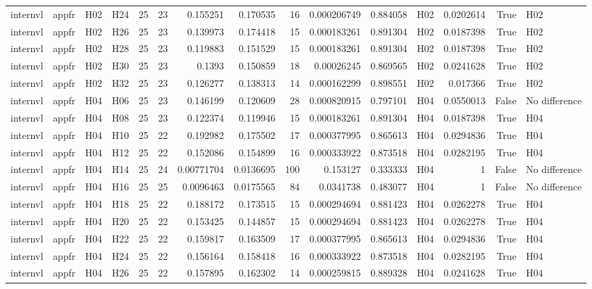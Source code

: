 \begin{longtable}{llllrrrrrrrlrrl}
internvl & appfr & H02 & H24 & 25 & 23 & 0.155251 & 0.170535 & 16 & 0.000206749 & 0.884058 & H02 & 0.0202614 & True & H02 \\
internvl & appfr & H02 & H26 & 25 & 23 & 0.139973 & 0.174418 & 15 & 0.000183261 & 0.891304 & H02 & 0.0187398 & True & H02 \\
internvl & appfr & H02 & H28 & 25 & 23 & 0.119883 & 0.151529 & 15 & 0.000183261 & 0.891304 & H02 & 0.0187398 & True & H02 \\
internvl & appfr & H02 & H30 & 25 & 23 & 0.1393 & 0.150859 & 18 & 0.00026245 & 0.869565 & H02 & 0.0241628 & True & H02 \\
internvl & appfr & H02 & H32 & 25 & 23 & 0.126277 & 0.138313 & 14 & 0.000162299 & 0.898551 & H02 & 0.017366 & True & H02 \\
internvl & appfr & H04 & H06 & 25 & 23 & 0.146199 & 0.120609 & 28 & 0.000820915 & 0.797101 & H04 & 0.0550013 & False & No difference \\
internvl & appfr & H04 & H08 & 25 & 23 & 0.122374 & 0.119946 & 15 & 0.000183261 & 0.891304 & H04 & 0.0187398 & True & H04 \\
internvl & appfr & H04 & H10 & 25 & 22 & 0.192982 & 0.175502 & 17 & 0.000377995 & 0.865613 & H04 & 0.0294836 & True & H04 \\
internvl & appfr & H04 & H12 & 25 & 22 & 0.152086 & 0.154899 & 16 & 0.000333922 & 0.873518 & H04 & 0.0282195 & True & H04 \\
internvl & appfr & H04 & H14 & 25 & 24 & 0.00771704 & 0.0136695 & 100 & 0.153127 & 0.333333 & H04 & 1 & False & No difference \\
internvl & appfr & H04 & H16 & 25 & 25 & 0.0096463 & 0.0175565 & 84 & 0.0341738 & 0.483077 & H04 & 1 & False & No difference \\
internvl & appfr & H04 & H18 & 25 & 22 & 0.188172 & 0.173515 & 15 & 0.000294694 & 0.881423 & H04 & 0.0262278 & True & H04 \\
internvl & appfr & H04 & H20 & 25 & 22 & 0.153425 & 0.144857 & 15 & 0.000294694 & 0.881423 & H04 & 0.0262278 & True & H04 \\
internvl & appfr & H04 & H22 & 25 & 22 & 0.159817 & 0.163509 & 17 & 0.000377995 & 0.865613 & H04 & 0.0294836 & True & H04 \\
internvl & appfr & H04 & H24 & 25 & 22 & 0.156164 & 0.158418 & 16 & 0.000333922 & 0.873518 & H04 & 0.0282195 & True & H04 \\
internvl & appfr & H04 & H26 & 25 & 22 & 0.157895 & 0.162302 & 14 & 0.000259815 & 0.889328 & H04 & 0.0241628 & True & H04 \\

\end{longtable}
